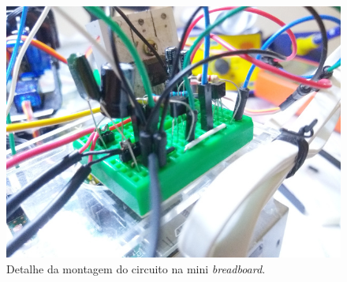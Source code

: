 \begin{apendicesenv}
\begin{figure}[H]
	\centering
	\includegraphics[width=1\linewidth]{figuras/vista_detalhe_circuito}
	\caption{Detalhe da montagem do circuito na mini \textit{breadboard}.}
	\label{fig:vistadetalhecircuito}
\end{figure}

\end{apendicesenv}
